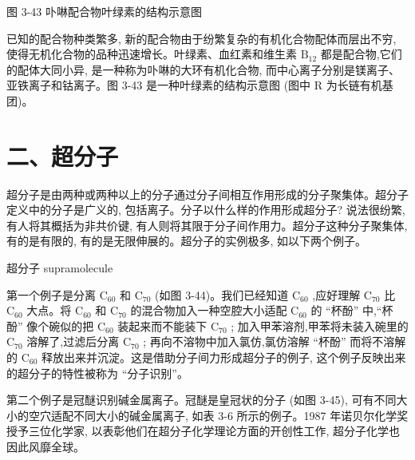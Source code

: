 \documentclass[10pt]{article}
\begin{document}
图 3-43 卟啉配合物叶绿素的结构示意图

已知的配合物种类繁多, 新的配合物由于纷繁复杂的有机化合物配体而层出不穷, 使得无机化合物的品种迅速增长。叶绿素、血红素和维生素 \({\mathrm{B}}_{12}\) 都是配合物,它们的配体大同小异, 是一种称为卟啉的大环有机化合物, 而中心离子分别是镁离子、 亚铁离子和钴离子。图 3-43 是一种叶绿素的结构示意图 (图中 \(\mathrm{R}\) 为长链有机基团)。

\section*{二、超分子}

超分子是由两种或两种以上的分子通过分子间相互作用形成的分子聚集体。超分子定义中的分子是广义的, 包括离子。分子以什么样的作用形成超分子? 说法很纷繁, 有人将其概括为非共价键, 有人则将其限于分子间作用力。超分子这种分子聚集体, 有的是有限的, 有的是无限伸展的。超分子的实例极多, 如以下两个例子。

\begin{mdframed}

超分子 supramolecule

\end{mdframed}

第一个例子是分离 \({\mathrm{C}}_{60}\) 和 \({\mathrm{C}}_{70}\) (如图 3-44)。我们已经知道 \({\mathrm{C}}_{60}\) ,应好理解 \({\mathrm{C}}_{70}\) 比 \({\mathrm{C}}_{60}\) 大点。将 \({\mathrm{C}}_{60}\) 和 \({\mathrm{C}}_{70}\) 的混合物加入一种空腔大小适配 \({\mathrm{C}}_{60}\) 的 “杯酚” 中,“杯酚” 像个碗似的把 \({\mathrm{C}}_{60}\) 装起来而不能装下 \({\mathrm{C}}_{70}\) ; 加入甲苯溶剂,甲苯将未装入碗里的 \({\mathrm{C}}_{70}\) 溶解了,过滤后分离 \({\mathrm{C}}_{70}\) ; 再向不溶物中加入氯仿,氯仿溶解 “杯酚” 而将不溶解的 \({\mathrm{C}}_{60}\) 释放出来并沉淀。这是借助分子间力形成超分子的例子, 这个例子反映出来的超分子的特性被称为 “分子识别”。

第二个例子是冠醚识别碱金属离子。冠醚是皇冠状的分子 (如图 3-45), 可有不同大小的空穴适配不同大小的碱金属离子, 如表 3-6 所示的例子。1987 年诺贝尔化学奖授予三位化学家, 以表彰他们在超分子化学理论方面的开创性工作, 超分子化学也因此风靡全球。
\end{document}
